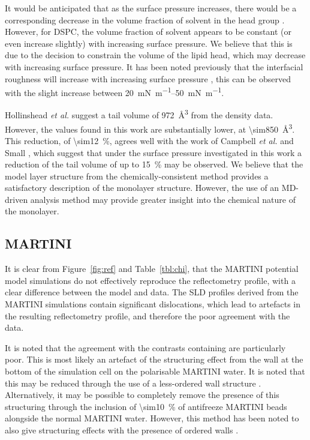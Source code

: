 \documentclass[amsmath,amssymb,twocolumn,superscriptaddress]{revtex4-1}
\begin{document}
It would be anticipated that as the surface pressure increases, there would be a corresponding decrease in the volume fraction of solvent in the head group \cite{bayerl_specular_1990}.
However, for DSPC, the volume fraction of solvent appears to be constant (or even increase slightly) with increasing surface pressure.
We believe that this is due to the decision to constrain the volume of the lipid head, which may decrease with increasing surface pressure.
It has been noted previously that the interfacial roughness will increase with increasing surface pressure \cite{lu_aspects_1994}, this can be observed with the slight increase between \SIrange{20}{50}{\milli\newton\per\meter}.

Hollinshead \emph{et al.} \cite{hollinshead_effects_2009} suggest a tail volume of \SI{972}{\angstrom\cubed} from the density data.
However, the values found in this work are substantially lower, at \SI{\sim850}{\angstrom\cubed}.
This reduction, of \SI{\sim12}{\percent}, agrees well with the work of Campbell \emph{et al.} \cite{campbell_structure_2018} and Small \cite{small_lateral_1984}, which suggest that under the surface pressure investigated in this work a reduction of the tail volume of up to \SI{15}{\percent} may be observed.
We believe that the model layer structure from the chemically-consistent method provides a satisfactory description of the monolayer structure.
However, the use of an MD-driven analysis method may provide greater insight into the chemical nature of the monolayer.

\subsection{MARTINI}
It is clear from Figure~\ref{fig:ref} and Table~\ref{tbl:chi}, that the MARTINI potential model simulations do not effectively reproduce the reflectometry profile, with a clear difference between the model and data.
The SLD profiles derived from the MARTINI simulations contain significant dislocations, which lead to artefacts in the resulting reflectometry profile, and therefore the poor agreement with the data.

It is noted that the agreement with the contrasts containing  are particularly poor.
This is most likely an artefact of the structuring effect from the wall at the bottom of the simulation cell on the polarisable MARTINI water.
It is noted that this may be reduced through the use of a less-ordered wall structure \cite{koutsioubas_combined_2016}.
Alternatively, it may be possible to completely remove the presence of this structuring through the inclusion of \SI{\sim10}{\percent} of antifreeze MARTINI beads alongside the normal MARTINI water.
However, this method has been noted to also give structuring effects with the presence of ordered walls \cite{marrink_comment_2010}.
\end{document}
